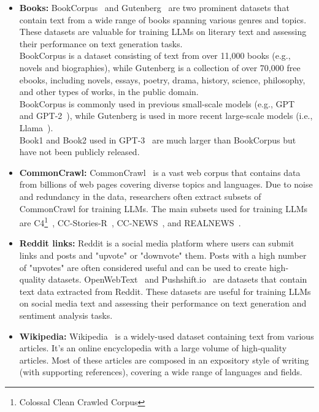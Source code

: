 \begin{itemize}
	\item \textbf{Books:} {
		      BookCorpus~\cite{zhu2015aligning} and Gutenberg~\cite{projectgutenberg} are two prominent datasets that contain text from a wide range of books spanning various genres and topics. These datasets are valuable for training LLMs on literary text and assessing their performance on text generation tasks.\\
		      BookCorpus is a dataset consisting of text from over 11,000 books (e.g., novels and biographies), while Gutenberg is a collection of over 70,000 free ebooks, including novels, essays, poetry, drama, history, science, philosophy, and other types of works, in the public domain.\\
		      BookCorpus is commonly used in previous small-scale models (e.g., GPT~\cite{radford2018improving} and GPT-2~\cite{radford2019language}), while Gutenberg is used in more recent large-scale models (i.e., Llama~\cite{touvron2023llama}).\\
		      Book1 and Book2 used in GPT-3~\cite{brown2020language} are much larger than BookCorpus but have not been publicly released.
	      }
	\item \textbf{CommonCrawl:} {
		      CommonCrawl~\cite{commoncrawl} is a vast web corpus that contains data from billions of web pages covering diverse topics and languages. Due to noise and redundancy in the data, researchers often extract subsets of CommonCrawl for training LLMs. The main subsets used for training LLMs are C4\footnote{Colossal Clean Crawled Corpus}~\cite{raffel2023exploring}, CC-Stories-R~\cite{trinh2018simple}, CC-NEWS~\cite{liu2019roberta}, and REALNEWS~\cite{zellers2019defending}.\\
	      }
	\item \textbf{Reddit links:} {
		      Reddit is a social media platform where users can submit links and posts and "upvote" or "downvote" them. Posts with a high number of "upvotes" are often considered useful and can be used to create high-quality datasets.
		      OpenWebText~\cite{gokaslan2019openwebtext} and Pushshift.io~\cite{baumgartner2020pushshift} are datasets that contain text data extracted from Reddit. These datasets are useful for training LLMs on social media text and assessing their performance on text generation and sentiment analysis tasks.
	      }
	\item \textbf{Wikipedia:} {
		      Wikipedia~\cite{wikipedia} is a widely-used dataset containing text from various articles. It's an online encyclopedia with a large volume of high-quality articles. Most of these articles are composed in an expository style of writing (with supporting references), covering a wide range of languages and fields.
}
\end{itemize}
